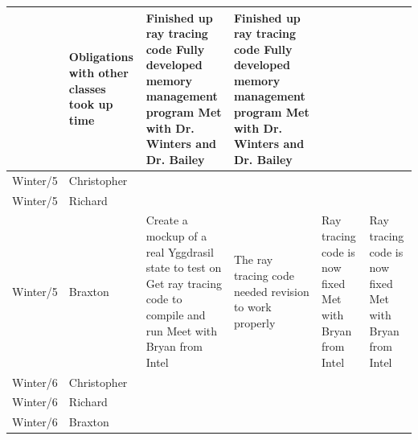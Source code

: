 \documentclass[onecolumn, draftclsnofoot,10pt, compsoc]{IEEEtran}
\begin{document}
\begin{tiny}
\begin{longtable}{ | p{} | p{} | p{} | p{} | p{} | p{} | }
&

Obligations with other classes took up time 

&

Finished up ray tracing code \newline
Fully developed memory management program \newline
Met with Dr. Winters and Dr. Bailey 

&

Finished up ray tracing code \newline
Fully developed memory management program \newline
Met with Dr. Winters and Dr. Bailey 

\\ \hline
Winter/5 & Christopher & 

&

&

&

\\ \hline
Winter/5 & Richard & 

&

&

&

\\ \hline
Winter/5 & Braxton & 

Create a mockup of a real Yggdrasil state to test on \newline
Get ray tracing code to compile and run \newline
Meet with Bryan from Intel 

&

The ray tracing code needed revision to work properly 

&

Ray tracing code is now fixed \newline
Met with Bryan from Intel 

&

Ray tracing code is now fixed \newline
Met with Bryan from Intel 

\\ \hline
Winter/6 & Christopher & 

&

&

&

\\ \hline
Winter/6 & Richard & 

&

&

&

\\ \hline
Winter/6 & Braxton & 


\end{longtable}
\end{tiny}
\end{document}
